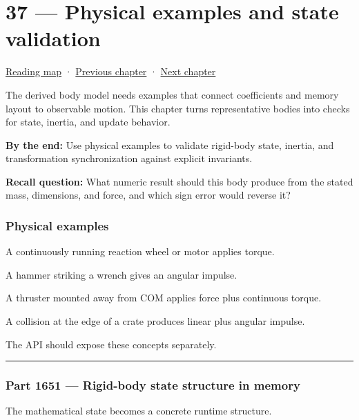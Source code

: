 \hypertarget{06-engine-ii-ch037}{}
\chapter{37 --- Physical examples and state validation}\label{06-engine-ii-ch037-physical-examples-and-state-validation}

\hyperref[volume-reading-map]{Reading map} · \hyperref[06-engine-ii-ch036-auditing-capsule-mass-properties-and-collision-formulas]{Previous chapter} · \hyperref[06-engine-ii-ch038-integrator-choices-and-energy-drift]{Next chapter}

The derived body model needs examples that connect coefficients and memory layout to observable motion. This chapter turns representative bodies into checks for state, inertia, and update behavior.

\textbf{By the end:} Use physical examples to validate rigid-body state, inertia, and transformation synchronization against explicit invariants.

\textbf{Recall question:} What numeric result should this body produce from the stated mass, dimensions, and force, and which sign error would reverse it?

\subsection{Physical examples}\label{06-engine-ii-ch037-physical-examples}

A continuously running reaction wheel or motor applies torque.

A hammer striking a wrench gives an angular impulse.

A thruster mounted away from COM applies force plus continuous torque.

A collision at the edge of a crate produces linear plus angular impulse.

The API should expose these concepts separately.

\begin{center}\rule{0.5\linewidth}{0.5pt}\end{center}

\subsection{Part 1651 --- Rigid-body state structure in memory}\label{06-engine-ii-ch037-part-1651-rigid-body-state-structure-in-memory}

The mathematical state becomes a concrete runtime structure.

